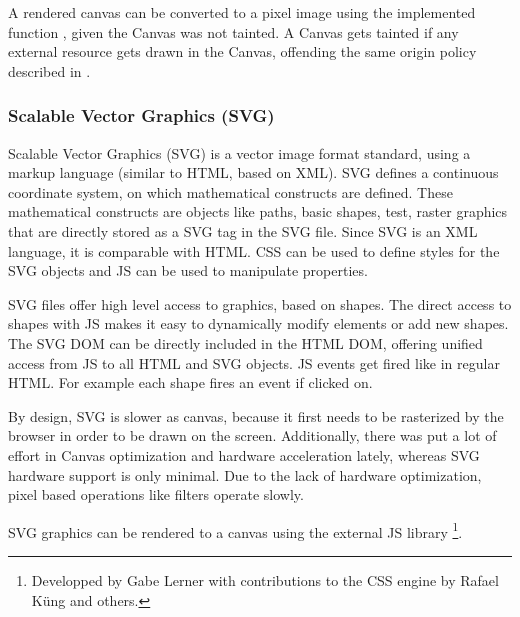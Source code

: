 A rendered canvas can be converted to a pixel image using the implemented function , given the Canvas was not tainted.
A Canvas gets tainted if any external resource gets drawn in the Canvas, offending the same origin policy described in .

\subsubsection{Scalable Vector Graphics (SVG)}
\label{sec:svg}

Scalable Vector Graphics (SVG) is a vector image format standard, using a markup language (similar to HTML, based on XML).
SVG defines a continuous coordinate system, on which mathematical constructs are defined.
These mathematical constructs are objects like paths, basic shapes, test, raster graphics that are directly stored as a SVG tag in the SVG file.
Since SVG is an XML language, it is comparable with HTML.
CSS can be used to define styles for the SVG objects and JS can be used to manipulate properties.

SVG files offer high level access to graphics, based on shapes.
The direct access to shapes with JS makes it easy to dynamically modify elements or add new shapes.
The SVG DOM can be directly included in the HTML DOM, offering unified access from JS to all HTML and SVG objects.
JS events get fired like in regular HTML.
For example each shape fires an  event if clicked on.


By design, SVG is slower as canvas, because it first needs to be rasterized by the browser in order to be drawn on the screen.
Additionally, there was put a lot of effort in Canvas optimization and hardware acceleration lately, whereas SVG hardware support is only minimal.
Due to the lack of hardware optimization, pixel based operations like filters operate slowly.

SVG graphics can be rendered to a canvas using the external JS library \footnote{Developped by Gabe Lerner with contributions to the CSS engine by Rafael Küng and others.}.




